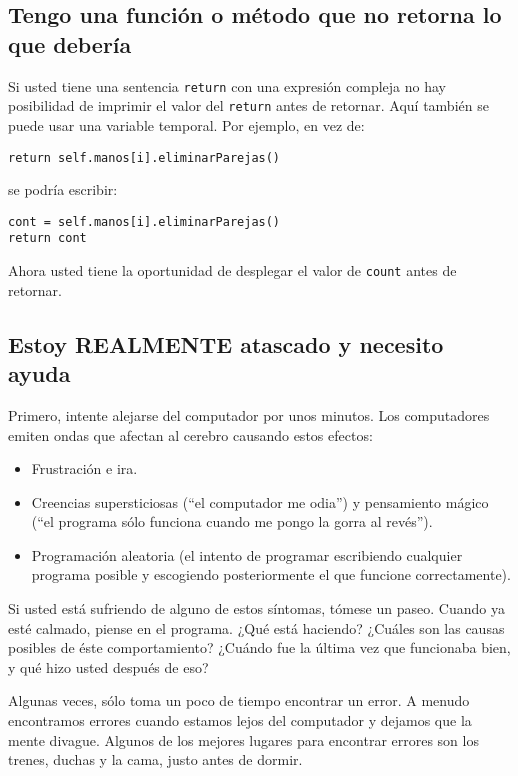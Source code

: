 \subsection{Tengo una función o método que no retorna lo que debería}

 

Si usted tiene una sentencia \texttt{return} con una expresión compleja
no hay posibilidad de imprimir el valor del \texttt{return} antes
de retornar. Aquí también se puede usar una variable temporal. Por
ejemplo, en vez de:

\begin{verbatim}
return self.manos[i].eliminarParejas()
\end{verbatim}
 se podría escribir:

\begin{verbatim}
cont = self.manos[i].eliminarParejas()
return cont
\end{verbatim}
 Ahora usted tiene la oportunidad de desplegar el valor de \texttt{count}
antes de retornar.

\subsection{Estoy REALMENTE atascado y necesito ayuda}

Primero, intente alejarse del computador por unos minutos. Los computadores
emiten ondas que afectan al cerebro causando estos efectos:
\begin{itemize}
\item Frustración e ira.
\item Creencias supersticiosas (``el computador me odia'') y pensamiento
mágico (``el programa sólo funciona cuando me pongo la gorra al revés'').
\item Programación aleatoria (el intento de programar escribiendo cualquier
programa posible y escogiendo posteriormente el que funcione correctamente).
\end{itemize}
Si usted está sufriendo de alguno de estos síntomas, tómese un paseo.
Cuando ya esté calmado, piense en el programa. ¿Qué está haciendo?
¿Cuáles son las causas posibles de éste comportamiento? ¿Cuándo fue
la última vez que funcionaba bien, y qué hizo usted después de eso?

Algunas veces, sólo toma un poco de tiempo encontrar un error. A menudo
encontramos errores cuando estamos lejos del computador y dejamos
que la mente divague. Algunos de los mejores lugares para encontrar
errores son los trenes, duchas y la cama, justo antes de dormir.

